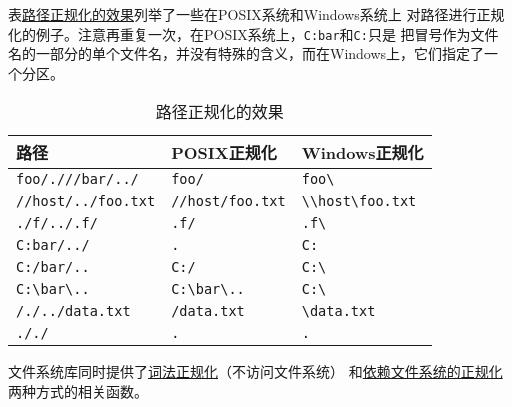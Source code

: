 表\hyperref[t20.1]{路径正规化的效果}列举了一些在POSIX系统和Windows系统上
对路径进行正规化的例子。注意再重复一次，在POSIX系统上，\texttt{C:bar}和\texttt{C:}只是
把冒号作为文件名的一部分的单个文件名，并没有特殊的含义，而在Windows上，它们指定了一个分区。
\begin{table}[ht]
    \centering
    \begin{tabular}{l|l|l}
        \hline
        \textbf{路径}                                    & \textbf{POSIX正规化}                              & \textbf{Windows正规化}                                               \\
        \hline
        \texttt{foo/.///bar/../}                       & \texttt{foo/}                                  & \texttt{foo\textbackslash}                                        \\
        \texttt{//host/../foo.txt}                     & \texttt{//host/foo.txt}                        & \texttt{\textbackslash \textbackslash host\textbackslash foo.txt} \\
        \texttt{./f/../.f/}                            & \texttt{.f/}                                   & \texttt{.f\textbackslash}                                         \\
        \texttt{C:bar/../}                             & \texttt{.}                                     & \texttt{C:}                                                       \\
        \texttt{C:/bar/..}                             & \texttt{C:/}                                   & \texttt{C:\textbackslash}                                         \\
        \texttt{C:\textbackslash bar\textbackslash ..} & \texttt{C:\textbackslash bar\textbackslash ..} & \texttt{C:\textbackslash}                                         \\
        \texttt{/./../data.txt}                        & \texttt{/data.txt}                             & \texttt{\textbackslash data.txt}                                  \\
        \texttt{././}                                  & \texttt{.}                                     & \texttt{.}                                                        \\
        \hline
    \end{tabular}
    \caption{路径正规化的效果}
    \label{t20.1}
\end{table}

文件系统库同时提供了\hyperref[ch20.3.3]{词法正规化}（不访问文件系统）
和\hyperref[ch20.4.5]{依赖文件系统的正规化}两种方式的相关函数。

